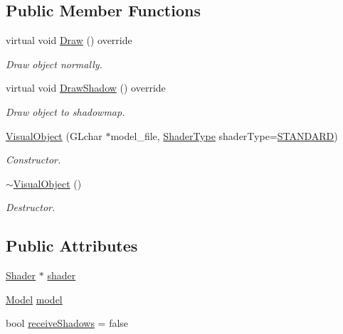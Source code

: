 \subsection*{Public Member Functions}
\begin{DoxyCompactItemize}
\item 
virtual void \mbox{\hyperlink{class_visual_object_a10c0e01e375fd4af08e57f3475dd312c}{Draw}} () override
\begin{DoxyCompactList}\small\item\em Draw object normally. \end{DoxyCompactList}\item 
virtual void \mbox{\hyperlink{class_visual_object_a88e778dc97ad93cefd5193d6899d6c82}{Draw\+Shadow}} () override
\begin{DoxyCompactList}\small\item\em Draw object to shadowmap. \end{DoxyCompactList}\item 
\mbox{\hyperlink{class_visual_object_acae4022cf0fa793dfba4ea5a91b9d242}{Visual\+Object}} (G\+Lchar $\ast$model\+\_\+file, \mbox{\hyperlink{_game_object_8h_a6230e1b9ecbf2d82d10856fd7e1fde46}{Shader\+Type}} shader\+Type=\mbox{\hyperlink{_texture_8h_a65468556d79304b3a4bfc464cc12e549a94e94133f4bdc1794c6b647b8ea134d0}{S\+T\+A\+N\+D\+A\+RD}})
\begin{DoxyCompactList}\small\item\em Constructor. \end{DoxyCompactList}\item 
\mbox{\hyperlink{class_visual_object_a068ba11545322d81d9ad8c675c4233f9}{$\sim$\+Visual\+Object}} ()
\begin{DoxyCompactList}\small\item\em Destructor. \end{DoxyCompactList}\end{DoxyCompactItemize}
\subsection*{Public Attributes}
\begin{DoxyCompactItemize}
\item 
\mbox{\hyperlink{class_shader}{Shader}} $\ast$ \mbox{\hyperlink{class_visual_object_a6d00e06796983b19f57d6fd86b202902}{shader}}
\item 
\mbox{\hyperlink{class_model}{Model}} \mbox{\hyperlink{class_visual_object_a325fec77ff1a5441f1ff4ffa98e508c8}{model}}
\item 
bool \mbox{\hyperlink{class_visual_object_af54b3c823b3ca24736faeedc88ef90f3}{receive\+Shadows}} = false
\end{DoxyCompactItemize}


